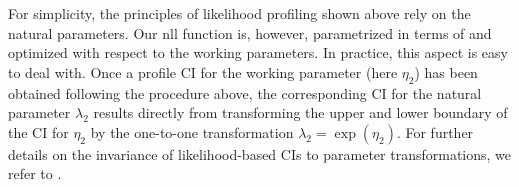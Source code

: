 \documentclass[bimj,fleqn]{w-art}\usepackage[]{graphicx}\usepackage[]{color}
\theoremstyle{plain}
\theoremstyle{definition}
\begin{document}
\bigskip

% 
% 

For simplicity, the principles of likelihood profiling shown above rely on the natural parameters.
Our nll function is, however, parametrized in terms of and optimized with respect to the working parameters.
In practice, this aspect is easy to deal with.
Once a profile CI for the working parameter (here $\eta_2$) has been obtained following the procedure above, the corresponding CI for the natural parameter $\lambda_2$ results directly from transforming the upper and lower boundary of the CI for $\eta_2$ by the one-to-one transformation $\lambda_2 = \exp(\eta_2)$.
For further details on the invariance of likelihood-based CIs to parameter transformations, we refer to \citet{meeker}.
\end{document}

